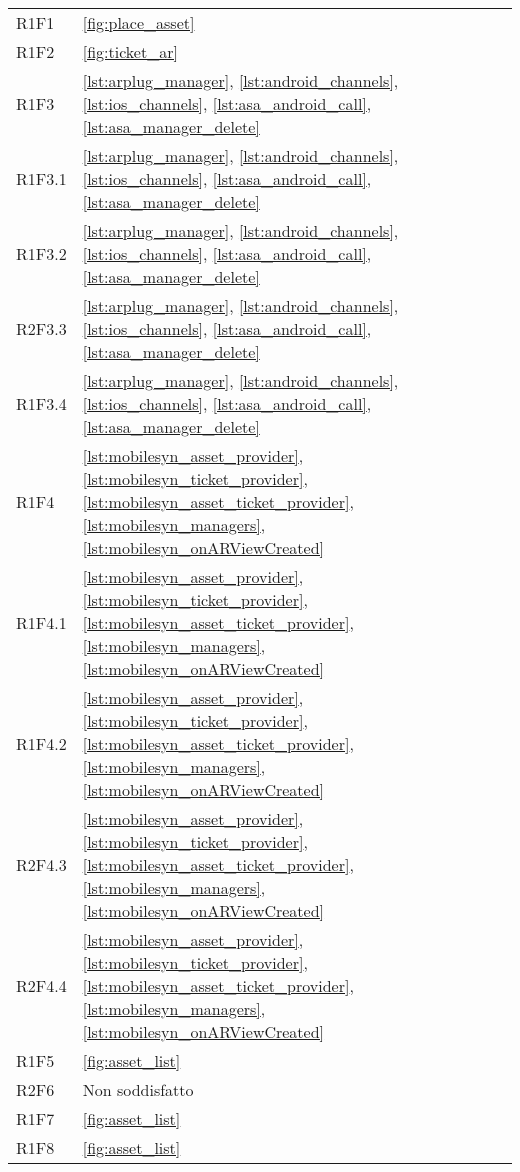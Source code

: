 {\begin{longtable}{C{.3\freewidth} C{.4\freewidth}}
    R1F1 & \ref{fig:place_asset}\\
    R1F2 & \ref{fig:ticket_ar}\\
    R1F3 &\ref{lst:arplug_manager}, \ref{lst:android_channels}, \ref{lst:ios_channels}, \ref{lst:asa_android_call}, \ref{lst:asa_manager_delete}\\
    R1F3.1 &\ref{lst:arplug_manager}, \ref{lst:android_channels}, \ref{lst:ios_channels}, \ref{lst:asa_android_call}, \ref{lst:asa_manager_delete}\\%
    R1F3.2 &\ref{lst:arplug_manager}, \ref{lst:android_channels}, \ref{lst:ios_channels}, \ref{lst:asa_android_call}, \ref{lst:asa_manager_delete}\\%
    R2F3.3 &\ref{lst:arplug_manager}, \ref{lst:android_channels}, \ref{lst:ios_channels}, \ref{lst:asa_android_call}, \ref{lst:asa_manager_delete}\\%
    R1F3.4 &\ref{lst:arplug_manager}, \ref{lst:android_channels}, \ref{lst:ios_channels}, \ref{lst:asa_android_call}, \ref{lst:asa_manager_delete}\\%
    R1F4 &\ref{lst:mobilesyn_asset_provider}, \ref{lst:mobilesyn_ticket_provider}, \ref{lst:mobilesyn_asset_ticket_provider}, \ref{lst:mobilesyn_managers}, \ref{lst:mobilesyn_onARViewCreated} \\
    R1F4.1 &\ref{lst:mobilesyn_asset_provider}, \ref{lst:mobilesyn_ticket_provider}, \ref{lst:mobilesyn_asset_ticket_provider}, \ref{lst:mobilesyn_managers}, \ref{lst:mobilesyn_onARViewCreated}\\
    R1F4.2 &\ref{lst:mobilesyn_asset_provider}, \ref{lst:mobilesyn_ticket_provider}, \ref{lst:mobilesyn_asset_ticket_provider}, \ref{lst:mobilesyn_managers}, \ref{lst:mobilesyn_onARViewCreated}\\
    R2F4.3 &\ref{lst:mobilesyn_asset_provider}, \ref{lst:mobilesyn_ticket_provider}, \ref{lst:mobilesyn_asset_ticket_provider}, \ref{lst:mobilesyn_managers}, \ref{lst:mobilesyn_onARViewCreated}\\
    R2F4.4 &\ref{lst:mobilesyn_asset_provider}, \ref{lst:mobilesyn_ticket_provider}, \ref{lst:mobilesyn_asset_ticket_provider}, \ref{lst:mobilesyn_managers}, \ref{lst:mobilesyn_onARViewCreated}\\
    R1F5 & \ref{fig:asset_list}\\
    R2F6 & Non soddisfatto \\
    R1F7 & \ref{fig:asset_list}\\
    R1F8 & \ref{fig:asset_list}\\

\end{longtable}}
